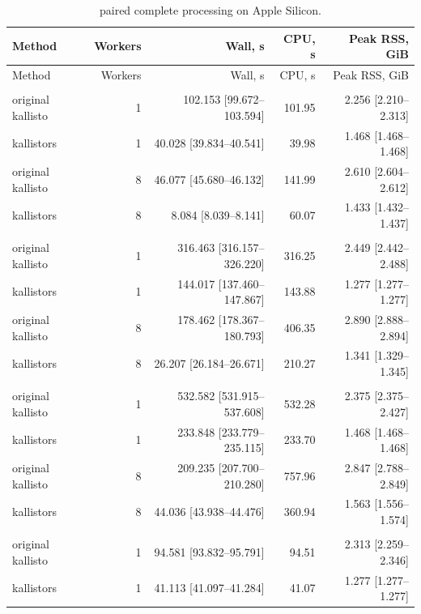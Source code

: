 \begingroup
\small
\setlength{\tabcolsep}{4pt}
\begin{longtable}{@{}lrrrr@{}}
\caption{paired complete processing on Apple Silicon.}\label{tab:paper-paired}\\
\toprule
Method & Workers & Wall, s & CPU, s & Peak RSS, GiB \\
\midrule
\endfirsthead
\toprule
Method & Workers & Wall, s & CPU, s & Peak RSS, GiB \\
\midrule
\endhead
\bottomrule
\endfoot
\addlinespace
\multicolumn{5}{@{}l}{\textit{gencode: SRR13638690}} \\
original kallisto & 1 & 102.153 [99.672--103.594] & 101.95 & 2.256 [2.210--2.313] \\
kallistors & 1 & 40.028 [39.834--40.541] & 39.98 & 1.468 [1.468--1.468] \\
original kallisto & 8 & 46.077 [45.680--46.132] & 141.99 & 2.610 [2.604--2.612] \\
kallistors & 8 & 8.084 [8.039--8.141] & 60.07 & 1.433 [1.432--1.437] \\
\addlinespace
\multicolumn{5}{@{}l}{\textit{gencode: SRR1039508}} \\
original kallisto & 1 & 316.463 [316.157--326.220] & 316.25 & 2.449 [2.442--2.488] \\
kallistors & 1 & 144.017 [137.460--147.867] & 143.88 & 1.277 [1.277--1.277] \\
original kallisto & 8 & 178.462 [178.367--180.793] & 406.35 & 2.890 [2.888--2.894] \\
kallistors & 8 & 26.207 [26.184--26.671] & 210.27 & 1.341 [1.329--1.345] \\
\addlinespace
\multicolumn{5}{@{}l}{\textit{gencode: SRR307903}} \\
original kallisto & 1 & 532.582 [531.915--537.608] & 532.28 & 2.375 [2.375--2.427] \\
kallistors & 1 & 233.848 [233.779--235.115] & 233.70 & 1.468 [1.468--1.468] \\
original kallisto & 8 & 209.235 [207.700--210.280] & 757.96 & 2.847 [2.788--2.849] \\
kallistors & 8 & 44.036 [43.938--44.476] & 360.94 & 1.563 [1.556--1.574] \\
\addlinespace
\multicolumn{5}{@{}l}{\textit{gencode: fragment-truth}} \\
original kallisto & 1 & 94.581 [93.832--95.791] & 94.51 & 2.313 [2.259--2.346] \\
kallistors & 1 & 41.113 [41.097--41.284] & 41.07 & 1.277 [1.277--1.277] \\

\end{longtable}
